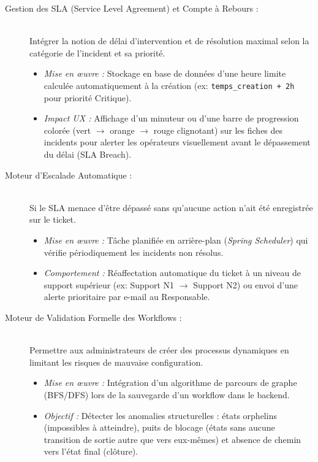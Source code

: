 \documentclass[12pt,a4paper]{article}
\begin{document}
\begin{description}
    \item[Gestion des SLA (Service Level Agreement) et Compte à Rebours :] \hfill \\
    Intégrer la notion de délai d'intervention et de résolution maximal selon la catégorie de l'incident et sa priorité.
    \begin{itemize}
        \item \textit{Mise en œuvre :} Stockage en base de données d'une heure limite calculée automatiquement à la création (ex: \texttt{temps\_creation + 2h} pour priorité Critique).
        \item \textit{Impact UX :} Affichage d'un minuteur ou d'une barre de progression colorée (vert $\rightarrow$ orange $\rightarrow$ rouge clignotant) sur les fiches des incidents pour alerter les opérateurs visuellement avant le dépassement du délai (SLA Breach).
    \end{itemize}

    \item[Moteur d'Escalade Automatique :] \hfill \\
    Si le SLA menace d'être dépassé sans qu'aucune action n'ait été enregistrée sur le ticket.
    \begin{itemize}
        \item \textit{Mise en œuvre :} Tâche planifiée en arrière-plan (\textit{Spring Scheduler}) qui vérifie périodiquement les incidents non résolus.
        \item \textit{Comportement :} Réaffectation automatique du ticket à un niveau de support supérieur (ex: Support N1 $\rightarrow$ Support N2) ou envoi d'une alerte prioritaire par e-mail au Responsable.
    \end{itemize}

    \item[Moteur de Validation Formelle des Workflows :] \hfill \\
    Permettre aux administrateurs de créer des processus dynamiques en limitant les risques de mauvaise configuration.
    \begin{itemize}
        \item \textit{Mise en œuvre :} Intégration d'un algorithme de parcours de graphe (BFS/DFS) lors de la sauvegarde d'un workflow dans le backend.
        \item \textit{Objectif :} Détecter les anomalies structurelles : états orphelins (impossibles à atteindre), puits de blocage (états sans aucune transition de sortie autre que vers eux-mêmes) et absence de chemin vers l'état final (clôture).
    \end{itemize}


\end{description}
\end{document}
